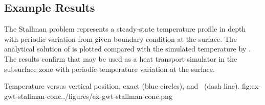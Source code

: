 \subsection{Example Results}

The Stallman problem represents a steady-state temperature profile in depth with periodic variation from given boundary condition at the surface. The analytical solution of \cite{stallman1965steady} is plotted compared with the simulated temperature by \mf.
The results confirm that \mf may be used as a heat transport simulator in the subsurface zone with periodic temperature variation at the surface.

\begin{StandardFigure}{
                                     Temperature versus vertical position, exact (blue circles), and \mf~(dash line).
                                     }{fig:ex-gwt-stallman-conc}{../figures/ex-gwt-stallman-conc.png}
\end{StandardFigure}